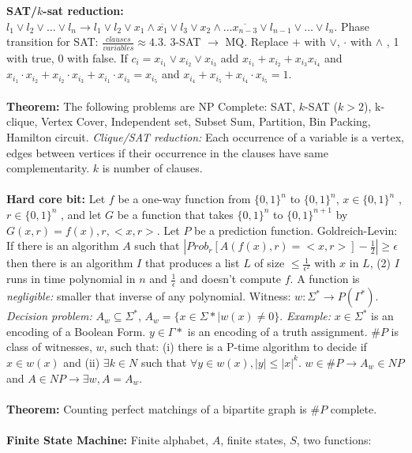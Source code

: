 {\bf SAT/$k$-sat reduction:}
$l_1 \vee l_2 \vee \ldots \vee l_n \rightarrow
l_1 \vee l_2 \vee x_1 \wedge
{\overline {x_1}} \vee l_3 \vee x_2 \wedge \ldots
{\overline {x_{n-3}}} \vee l_{n-1} \vee \ldots \vee l_n$.
Phase transition for SAT: ${\frac {clauses} {variables}} \approx 4.3$.
3-SAT $\rightarrow$ MQ.  Replace $+$ with $\vee$, $\cdot$ with $\wedge$ , 1 with true,
0 with false.  If $c_i= x_{i_1} \vee x_{i_2} \vee x_{i_3}$ add
$x_{i_1} + x_{i_2} + x_{i_3} x_{i_4}$ and
$x_{i_1} \cdot x_{i_2} + x_{i_2} \cdot x_{i_3} + x_{i_1} \cdot x_{i_3} = x_{i_5}$
and $x_{i_4} + x_{i_5} + x_{i_4} \cdot x_{i_5} =1$.
\\
\\
{\bf Theorem:} The following problems are
NP Complete: SAT, $k$-SAT ($k>2$), k-clique, Vertex Cover, Independent set,
Subset Sum, Partition, Bin Packing, Hamilton circuit.
\emph{Clique/SAT reduction:} Each occurrence of a variable is a vertex, edges
between vertices if their occurrence in the clauses have same complementarity.
$k$ is number of clauses.
\\
\\
{\bf Hard core bit:} Let $f$ be a one-way function from
$\{0,1\}^n$ to $\{0,1\}^n$,
$x \in \{0,1\}^n$ ,
$r \in \{0,1\}^n$ ,
and let $G$ be a function that takes
$\{0,1\}^n$ to $\{0,1\}^{n+1}$ by $G(x,r)= f(x), r, <x,r>$.  Let $P$ be a
prediction function.  Goldreich-Levin: If there is an algorithm $A$ such
that $| Prob_r [A(f(x), r) = <x,r>] - {\frac {1} {2}} | \geq \epsilon$ then
there is an algorithm $I$ that produces a list $L$ of size $\leq
{\frac {1} {{\epsilon^2}}}$ with $x$ in $L$, (2) $I$ runs in time
polynomial in $n$ and ${\frac {1} {\epsilon}}$ and doesn't compute $f$.
A function is \emph{negligible:} smaller that inverse of any polynomial.
Witness: $w:\Sigma^* \rightarrow P( \Gamma^* )$.  \emph{Decision problem:}
$A_w \subseteq \Sigma^*$, $A_w= \{ x \in
\Sigma * | w(x) \ne 0 \}$.
\emph{Example:} $x \in \Sigma^*$ is an encoding of a Boolean Form.
$y \in \Gamma *$
is an encoding of a truth assignment.
$\#P$ is class of witnesses, $w$, such that: (i) there is a P-time algorithm
to decide if $x \in w(x)$ and (ii)
$\exists k \in N$ such that $\forall y \in
w(x),
|y| \leq |x|^k$.  $w \in \#P \rightarrow A_w \in NP$ and
$A \in
NP \rightarrow \exists w, A=A_w$.
\\
\\
{\bf Theorem:}
Counting perfect matchings of a bipartite graph is $\#P$ complete.
\\
\\
{\bf Finite State Machine:} Finite alphabet, $A$, finite states, $S$, two functions:
